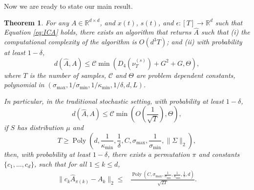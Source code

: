 \documentclass{article} %
\newcommand{\real}{\mathbb{R}}
\DeclareMathOperator{\pol}{Poly}
\newcommand{\poly}[1]{\pol\left(#1\right)}
\newtheorem{thm}[lemma]{Theorem}
\theoremstyle{definition}
\begin{document}
Now we are ready to state our main result. 
\begin{thm}
\label{thm:finalRes} 
For any $A\in \real^{d\times d}$, and $x(t)$, $s(t)$, and $\epsilon: [T] \rightarrow \real^d$ such that Equation \ref{eq:ICA} holds,
there exists an algorithm that returns $\hat{A}$
such that (i) the computational complexity of the algorithm is $O(d^3 T)$; and (ii) with probability at least $1-\delta$,
\[
d(\hat{A}, A) \le \mathcal{C} \min\left(D_4(\nu_T^{(s)})+ G^2 +G, \Theta \right),
\]
where $T$ is the number of samples, $\mathcal{C}$ and $\Theta$ are problem dependent constants, polynomial in $(\sigma_{\max}, 1/\sigma_{\min}, 1/\kappa_{\min},1/\delta, d, L)$.

In particular, in the traditional stochastic setting, with probability at least $1-\delta$,
\[
d(\hat{A}, A) \le \mathcal{C} \min\left(O(\frac{1}{\sqrt{T}}), \Theta \right),
\]
if $S$ has distribution $\mu$ and
\[
T \ge \poly{d, \frac{1}{\kappa_{\min}}, \frac{1}{\delta}, C, \sigma_{\max}, \frac{1}{\sigma_{\min}}, \|\Sigma\|_2},
\]
then, with probability at least $1-\delta$, there exists a permutation $\pi$ and constants $\{c_1,\ldots,c_d\}$, such that for all $1\le k\le d$,
\begin{align*}
 \| c_k\hat{A}_{\pi(k)} - A_k\|_2 \le 
& \frac{\poly{C, \sigma_{\max}, \frac{1}{\sigma_{\min}}, \frac{1}{\kappa_{\min}},\frac{1}{\delta}, d}}{\sqrt{2T}}.
\end{align*}
\fi
\end{thm}

\end{document}
